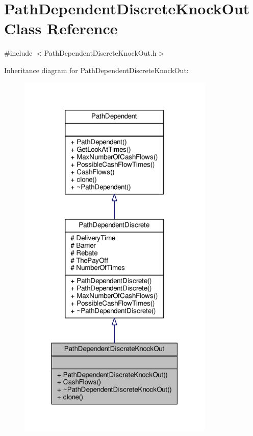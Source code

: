 \hypertarget{classPathDependentDiscreteKnockOut}{}\section{Path\+Dependent\+Discrete\+Knock\+Out Class Reference}
\label{classPathDependentDiscreteKnockOut}


{\ttfamily \#include $<$Path\+Dependent\+Discrete\+Knock\+Out.\+h$>$}



Inheritance diagram for Path\+Dependent\+Discrete\+Knock\+Out\+:
\nopagebreak
\begin{figure}[H]
\begin{center}
\leavevmode
\includegraphics[width=265pt]{classPathDependentDiscreteKnockOut__inherit__graph}
\end{center}
\end{figure}



